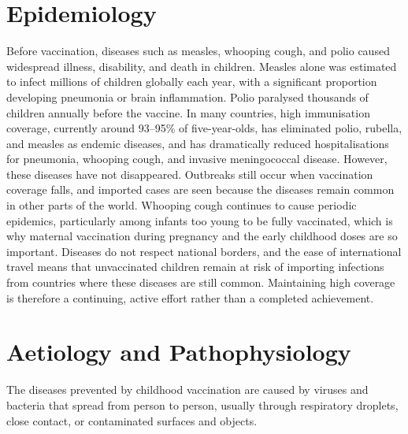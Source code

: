 \section*{Epidemiology}
Before vaccination, diseases such as measles, whooping cough, and polio caused widespread illness, disability, and death in children. Measles alone was estimated to infect millions of children globally each year, with a significant proportion developing pneumonia or brain inflammation. Polio paralysed thousands of children annually before the vaccine. In many countries, high immunisation coverage, currently around 93--95\% of five-year-olds, has eliminated polio, rubella, and measles as endemic diseases, and has dramatically reduced hospitalisations for pneumonia, whooping cough, and invasive meningococcal disease. However, these diseases have not disappeared. Outbreaks still occur when vaccination coverage falls, and imported cases are seen because the diseases remain common in other parts of the world. Whooping cough continues to cause periodic epidemics, particularly among infants too young to be fully vaccinated, which is why maternal vaccination during pregnancy and the early childhood doses are so important. Diseases do not respect national borders, and the ease of international travel means that unvaccinated children remain at risk of importing infections from countries where these diseases are still common. Maintaining high coverage is therefore a continuing, active effort rather than a completed achievement.

\section*{Aetiology and Pathophysiology}
The diseases prevented by childhood vaccination are caused by viruses and bacteria that spread from person to person, usually through respiratory droplets, close contact, or contaminated surfaces and objects.

